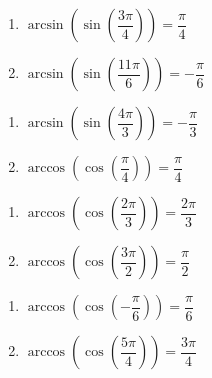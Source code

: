 \begin{multicols}{2}

\begin{enumerate}

\setcounter{enumi}{\value{HW}}

\item  $\arcsin\left(\sin\left(\dfrac{3\pi}{4}\right) \right) = \dfrac{\pi}{4}$
\item  $\arcsin\left(\sin\left(\dfrac{11\pi}{6}\right) \right) = -\dfrac{\pi}{6}$

\setcounter{HW}{\value{enumi}}

\end{enumerate}

\end{multicols}

\begin{multicols}{2}

\begin{enumerate}

\setcounter{enumi}{\value{HW}}

\item  $\arcsin\left(\sin\left(\dfrac{4\pi}{3}\right) \right) = -\dfrac{\pi}{3}$
\item  $\arccos\left(\cos\left(\dfrac{\pi}{4}\right) \right) = \dfrac{\pi}{4}$ 

\setcounter{HW}{\value{enumi}}

\end{enumerate}

\end{multicols}

\begin{multicols}{2}

\begin{enumerate}

\setcounter{enumi}{\value{HW}}

\item  $\arccos\left(\cos\left(\dfrac{2\pi}{3}\right) \right) = \dfrac{2\pi}{3}$
\item  $\arccos\left(\cos\left(\dfrac{3\pi}{2}\right) \right) = \dfrac{\pi}{2}$

\setcounter{HW}{\value{enumi}}

\end{enumerate}

\end{multicols}

\begin{multicols}{2}

\begin{enumerate}

\setcounter{enumi}{\value{HW}}

\item  $\arccos\left(\cos\left(-\dfrac{\pi}{6}\right) \right) = \dfrac{\pi}{6}$ 
\item  $\arccos\left(\cos\left(\dfrac{5\pi}{4}\right) \right) = \dfrac{3\pi}{4}$

\setcounter{HW}{\value{enumi}}

\end{enumerate}

\end{multicols}

